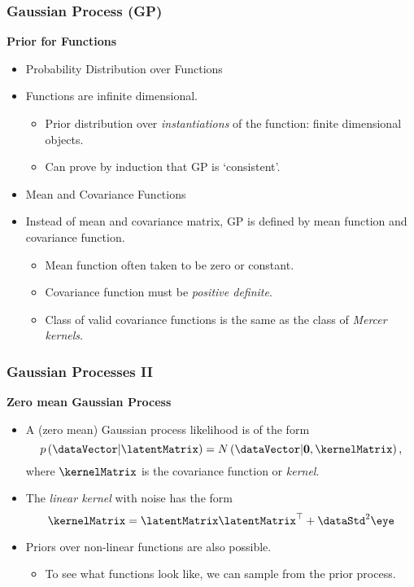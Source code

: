 \begin{frame}
  \frametitle{Gaussian Process (GP)}

  \textbf{Prior for Functions}
  \begin{itemize}
  \item Probability Distribution over Functions
  \item Functions are infinite dimensional.

    \begin{itemize}
    \item Prior distribution over \emph{instantiations} of the function: finite
      dimensional objects.
    \item Can prove by induction that GP is `consistent'.
    \end{itemize}
  \item Mean and Covariance Functions
  \item Instead of mean and covariance matrix, GP is defined by mean function
    and covariance function.

    \begin{itemize}
    \item Mean function often taken to be zero or constant.
    \item Covariance function must be \emph{positive definite}.
    \item Class of valid covariance functions is the same as the class
      of \emph{Mercer kernels}.
    \end{itemize}
  \end{itemize}

\end{frame}

\begin{frame}
  \frametitle{Gaussian Processes II}

  \textbf{Zero mean Gaussian Process}
  \begin{itemize}
  \item A (zero mean) Gaussian process likelihood is of the form\[
    p\left(\dataVector|\latentMatrix\right)=N\left(\dataVector|\mathbf{0},\kernelMatrix\right),\]
    where $\kernelMatrix$ is the covariance function or \emph{kernel}.
  \item The \emph{linear kernel} with noise has the form\[
    \kernelMatrix=\latentMatrix\latentMatrix^{\top}+\dataStd^{2}\eye\]

  \item Priors over non-linear functions are also possible.

    \begin{itemize}
    \item To see what functions look like, we can sample from the prior process.
    \end{itemize}
  \end{itemize}

\end{frame}

